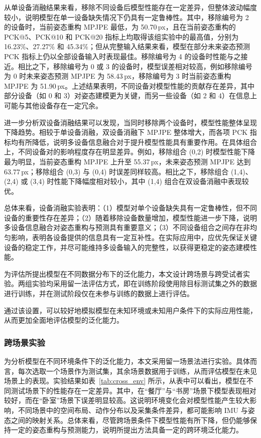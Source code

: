 从单设备消融结果来看，移除不同设备后模型性能存在一定差异，但整体波动幅度较小，说明模型在单一设备缺失情况下仍具有一定鲁棒性。其中，移除编号为 2 的设备时，当前姿态重构 MPJPE 最低，为 50.70\,px，且在当前姿态重构的 PCK@5、PCK@10 和 PCK@20 指标上均取得该组实验中的最高值，分别为 16.23\%、27.27\% 和 45.34\%；但从完整输入结果来看，模型在部分未来姿态预测 PCK 指标上仍以全部设备输入时表现最佳。移除编号为 4 的设备时性能与之接近。相比之下，移除编号为 0 或 3 的设备时，模型误差相对较高，例如移除编号为 0 时未来姿态预测 MPJPE 为 58.43\,px，移除编号为 3 时当前姿态重构 MPJPE 为 51.90\,px。上述结果表明，不同设备对模型性能的贡献存在差异，其中部分设备（如 0 和 3）对姿态建模更为关键，而另一些设备（如 2 和 4）在信息上可能与其他设备存在一定冗余。

进一步分析双设备消融结果可以发现，当同时移除两个设备时，模型性能整体呈现下降趋势。相较于单设备消融，双设备消融下 MPJPE 整体增大，而各项 PCK 指标均有所降低，说明多设备信息融合对于提升模型性能具有重要作用。在具体组合上，不同设备对的影响程度存在明显差异。例如，移除组合 (0,2) 时模型性能下降最为明显，当前姿态重构 MPJPE 上升至 55.37\,px，未来姿态预测 MPJPE 达到 63.77\,px；移除组合 (0,3) 与 (0,4) 时误差同样较高。相比之下，移除组合 (1,4)、(2,4) 或 (3,4) 时性能下降幅度相对较小，其中 (1,4) 组合在双设备消融中表现较优。

总体来看，设备消融实验表明：（1）模型对单个设备缺失具有一定鲁棒性，但不同设备的重要性存在差异；（2）随着移除设备数量增加，模型性能进一步下降，说明多设备信息融合对姿态重构与预测具有重要意义；（3）不同设备组合之间存在非均匀影响，表明各设备提供的信息具有一定互补性。在实际应用中，应优先保证关键设备的稳定工作，并尽可能维持多设备输入的完整性，以获得更稳定的姿态建模性能。


为评估所提出模型在不同数据分布下的泛化能力，本文设计跨场景与跨受试者实验。两组实验均采用留一法评估方式，即在训练阶段使用除目标测试集之外的数据进行训练，并在测试阶段仅在未参与训练的数据上进行评估。

通过该设置，可以较好地模拟模型在未知环境或未知用户条件下的实际应用性能，从而更加全面地评估模型的泛化能力。

\subsubsection{跨场景实验}{}

为分析模型在不同环境条件下的泛化能力，本文采用留一场景法进行实验。具体而言，每次选取一个场景作为测试集，其余场景数据用于训练，从而评估模型在未见场景上的表现。实验结果如表~\ref{tab:cross_env} 所示，从表中可以看出，模型在不同测试场景下的性能存在一定差异。其中，在“餐厅”与“书房”场景下模型表现相对较好，而在“卧室”场景下误差明显较高。这说明环境变化会对模型性能产生较大影响，不同场景中的空间布局、动作分布以及采集条件差异，都可能影响 IMU 与姿态之间的映射关系。总体来看，尽管跨场景条件下模型性能有所下降，但仍能够保持一定的姿态重构与预测能力，说明所提出方法具备一定的跨环境泛化能力。

